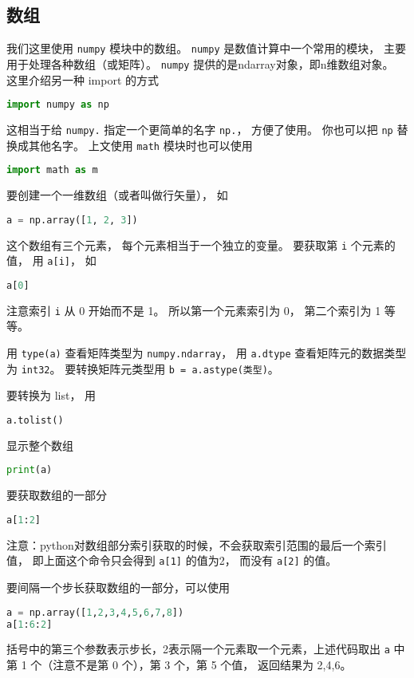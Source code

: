

\subsection{数组}
我们这里使用 \verb`numpy` 模块中的数组。 \verb`numpy` 是数值计算中一个常用的模块， 主要用于处理各种数组（或矩阵）。 \verb`numpy` 提供的是ndarray对象，即n维数组对象。 这里介绍另一种 import 的方式
\begin{lstlisting}[language=python]
import numpy as np
\end{lstlisting}
这相当于给 \verb`numpy.` 指定一个更简单的名字 \verb`np.`， 方便了使用。 你也可以把 \verb`np` 替换成其他名字。 上文使用 \verb`math` 模块时也可以使用
\begin{lstlisting}[language=python]
import math as m
\end{lstlisting}

要创建一个一维数组（或者叫做行矢量）， 如
\begin{lstlisting}[language=python]
a = np.array([1, 2, 3])
\end{lstlisting}
这个数组有三个元素， 每个元素相当于一个独立的变量。 要获取第 \verb`i` 个元素的值， 用 \verb`a[i]`， 如
\begin{lstlisting}[language=python]
a[0]
\end{lstlisting}
注意索引 \verb`i` 从 0 开始而不是 1。 所以第一个元素索引为 0， 第二个索引为 1 等等。

用 \verb`type(a)` 查看矩阵类型为 \verb`numpy.ndarray`， 用 \verb`a.dtype` 查看矩阵元的数据类型为 \verb`int32`。 要转换矩阵元类型用 \verb`b = a.astype(类型)`。

要转换为 list， 用
\begin{lstlisting}[language=python]
a.tolist()
\end{lstlisting}

显示整个数组
\begin{lstlisting}[language=python]
print(a)
\end{lstlisting}
要获取数组的一部分
\begin{lstlisting}[language=python]
a[1:2]
\end{lstlisting}
注意：python对数组部分索引获取的时候，不会获取索引范围的最后一个索引值， 即上面这个命令只会得到 \verb`a[1]` 的值为2， 而没有 \verb`a[2]` 的值。

要间隔一个步长获取数组的一部分，可以使用
\begin{lstlisting}[language=python]
a = np.array([1,2,3,4,5,6,7,8])
a[1:6:2]
\end{lstlisting}
括号中的第三个参数表示步长，2表示隔一个元素取一个元素，上述代码取出 \verb`a` 中第 1 个（注意不是第 0 个），第  3 个，第 5 个值， 返回结果为 2,4,6。

